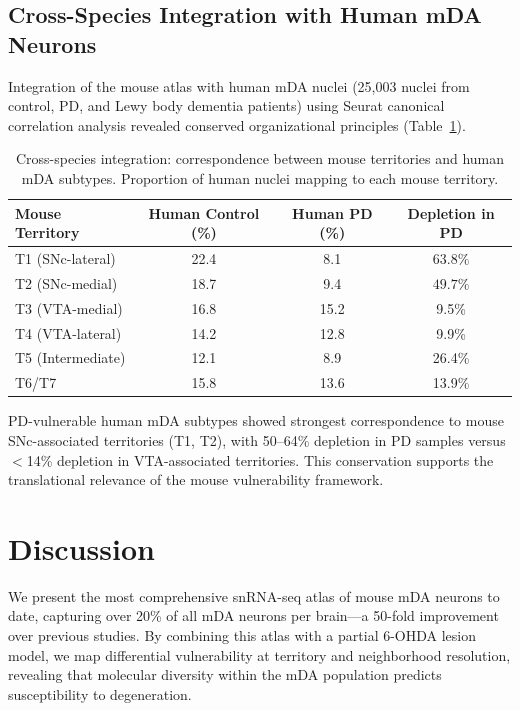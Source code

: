 \documentclass[11pt]{article}
\begin{document}
\subsection{Cross-Species Integration with Human mDA Neurons}

Integration of the mouse atlas with human mDA nuclei (25,003 nuclei from control, PD, and Lewy body dementia patients) using Seurat canonical correlation analysis \citep{stuart2019comprehensive, hao2021integrated, cca_integration2018} revealed conserved organizational principles (Table~\ref{tab:human}).

\begin{table}[H]
\centering
\caption{Cross-species integration: correspondence between mouse territories and human mDA subtypes. Proportion of human nuclei mapping to each mouse territory.}
\label{tab:human}
\begin{tabular}{lccc}
\toprule
Mouse Territory & Human Control (\%) & Human PD (\%) & Depletion in PD \\
\midrule
T1 (SNc-lateral) & 22.4 & 8.1 & $\mathbf{63.8\%}$ \\
T2 (SNc-medial) & 18.7 & 9.4 & $\mathbf{49.7\%}$ \\
T3 (VTA-medial) & 16.8 & 15.2 & 9.5\% \\
T4 (VTA-lateral) & 14.2 & 12.8 & 9.9\% \\
T5 (Intermediate) & 12.1 & 8.9 & 26.4\% \\
T6/T7 & 15.8 & 13.6 & 13.9\% \\
\bottomrule
\end{tabular}
\end{table}

PD-vulnerable human mDA subtypes showed strongest correspondence to mouse SNc-associated territories (T1, T2), with 50--64\% depletion in PD samples versus $<$14\% depletion in VTA-associated territories. This conservation supports the translational relevance of the mouse vulnerability framework.

\section{Discussion}

We present the most comprehensive snRNA-seq atlas of mouse mDA neurons to date, capturing over 20\% of all mDA neurons per brain---a 50-fold improvement over previous studies. By combining this atlas with a partial 6-OHDA lesion model, we map differential vulnerability at territory and neighborhood resolution, revealing that molecular diversity within the mDA population predicts susceptibility to degeneration.
\end{document}
